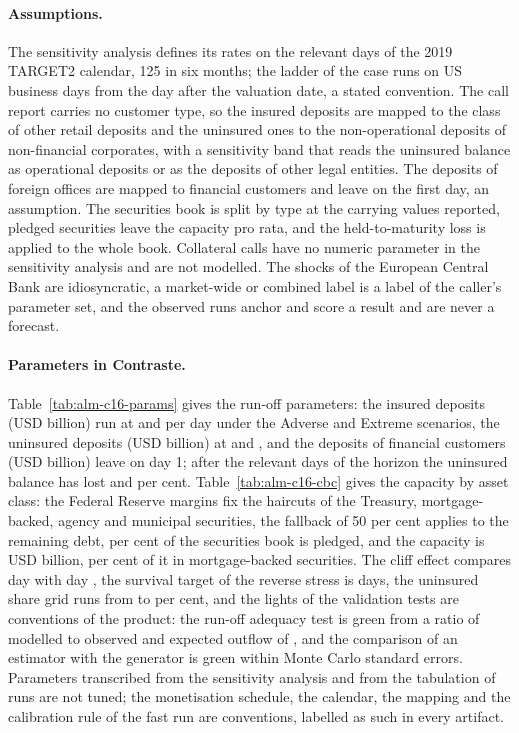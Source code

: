 \paragraph{Assumptions.}
The sensitivity analysis defines its rates on the relevant days of the 2019 TARGET2 calendar, 125 in six months; the ladder of the case runs on US business days from the day after the valuation date, a stated convention. The call report carries no customer type, so the insured deposits are mapped to the class of other retail deposits and the uninsured ones to the non-operational deposits of non-financial corporates, with a sensitivity band that reads the uninsured balance as operational deposits or as the deposits of other legal entities. The deposits of foreign offices are mapped to financial customers and leave on the first day, an assumption. The securities book is split by type at the carrying values reported, pledged securities leave the capacity pro rata, and the held-to-maturity loss is applied to the whole book. Collateral calls have no numeric parameter in the sensitivity analysis and are not modelled. The shocks of the European Central Bank are idiosyncratic, a market-wide or combined label is a label of the caller's parameter set, and the observed runs anchor and score a result and are never a forecast.

\paragraph{Parameters in Contraste.}
Table~\ref{tab:alm-c16-params} gives the run-off parameters: the insured deposits (USD \almLRetailBalance{} billion) run at \almLRetailRateAdv{} and \almLRetailRateExt{} per day under the Adverse and Extreme scenarios, the uninsured deposits (USD \almLCorpBalance{} billion) at \almLCorpRateAdv{} and \almLCorpRateExt{}, and the deposits of financial customers (USD \almLFinBalance{} billion) leave on day 1; after the \almLHorizonDays{} relevant days of the horizon the uninsured balance has lost \almLCorpAdv{} and \almLCorpExt{} per cent. Table~\ref{tab:alm-c16-cbc} gives the capacity by asset class: the Federal Reserve margins fix the haircuts of the Treasury, mortgage-backed, agency and municipal securities, the fallback of 50 per cent applies to the remaining debt, \almLPledged{} per cent of the securities book is pledged, and the capacity is USD \almLCbcAll{} billion, \almLCbcMbsShare{} per cent of it in mortgage-backed securities. The cliff effect compares day \almLCliffNear{} with day \almLCliffFar{}, the survival target of the reverse stress is \almLReverseTarget{} days, the uninsured share grid runs from \almLShareLow{} to \almLShareHigh{} per cent, and the lights of the validation tests are conventions of the product: the run-off adequacy test is green from a ratio of modelled to observed and expected outflow of \almLAdequacyGreen{}, and the comparison of an estimator with the generator is green within \almLGenGreen{} Monte Carlo standard errors. Parameters transcribed from the sensitivity analysis and from the tabulation of runs are not tuned; the monetisation schedule, the calendar, the mapping and the calibration rule of the fast run are conventions, labelled as such in every artifact.

